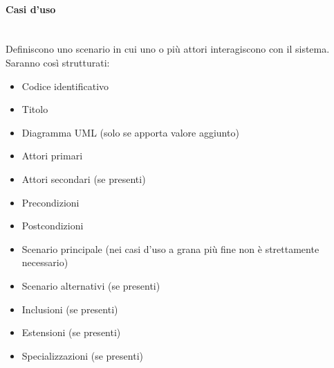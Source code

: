 \paragraph{Casi d'uso}\mbox{}\\
Definiscono uno scenario in cui uno o più attori interagiscono con il sistema. Saranno così strutturati:
\begin{itemize}
\item Codice identificativo
\item Titolo
\item Diagramma UML (solo se apporta valore aggiunto)
\item Attori primari
\item Attori secondari (se presenti)
\item Precondizioni
\item Postcondizioni
\item Scenario principale (nei casi d’uso a grana più fine non è strettamente necessario)
\item Scenario alternativi (se presenti)
\item Inclusioni (se presenti)
\item Estensioni (se presenti)
\item Specializzazioni (se presenti)
\end{itemize}
